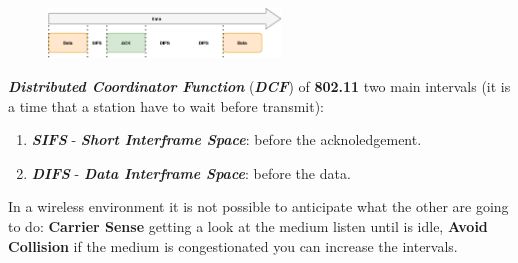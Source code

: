 \begin{figure}[h]
    \centering
    \includegraphics[width=0.55\textwidth]{img/802_11_dcf}
\end{figure}
\begin{boxA}
    \textbf{\textit{Distributed Coordinator Function}} (\textbf{\textit{DCF}}) of \textbf{802.11} two main intervals (it is a time that a station have to wait before transmit):
    \begin{enumerate}[nosep]
        \item \textbf{\textit{SIFS}} - \textbf{\textit{Short Interframe Space}}: before the acknoledgement.
        \item \textbf{\textit{DIFS}} - \textbf{\textit{Data Interframe Space}}: before the data.
    \end{enumerate}
    In a wireless environment it is not possible to anticipate what the other are going to do: \textbf{Carrier Sense} getting a look at the medium listen until is idle, \textbf{Avoid Collision} if the medium is congestionated you can increase the intervals.
\end{boxA}

